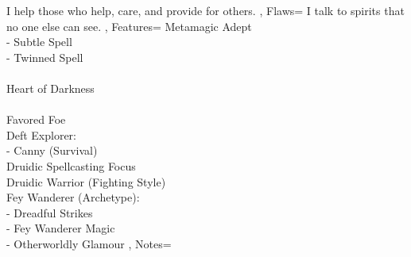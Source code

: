 \documentclass[10pt,a4paper]{scrbook}
\begin{document}
{{			I help those who help, care, and provide for others.
		},
		Flaws={
			I talk to spirits that no one else can see.
		},
		Features={
			Metamagic Adept\\
			- Subtle Spell\\
			- Twinned Spell\\
			\\
			Heart of Darkness\\
			\\
			Favored Foe\\ %
			Deft Explorer:\\ %
			- Canny (Survival)\\
			Druidic Spellcasting Focus\\
			Druidic Warrior (Fighting Style)\\
			Fey Wanderer (Archetype):\\
			- Dreadful Strikes\\
			- Fey Wanderer Magic\\
			- Otherworldly Glamour
		},
		Notes={
		}
	}
\end{document}
